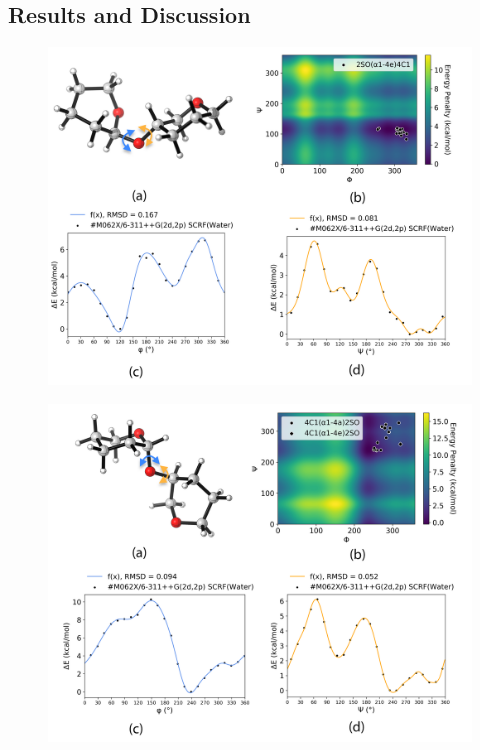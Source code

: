 \documentclass[a4paper, 12pt, openany]{book}
\begin{document}
\subsection{Results and Discussion}
\begin{figure}[h]
    \centering
    \includegraphics[width=14cm]{Figures/Torsions/2so_1c4.png}
    \caption{}
    \label{fig:2sO_4c1}
\end{figure}

\begin{figure}[h]
    \centering
    \includegraphics[width=14cm]{Figures/Torsions/4c1_a_2so.png}
    \caption{}
    \label{fig:4c1_2sO}
\end{figure}
\end{document}
